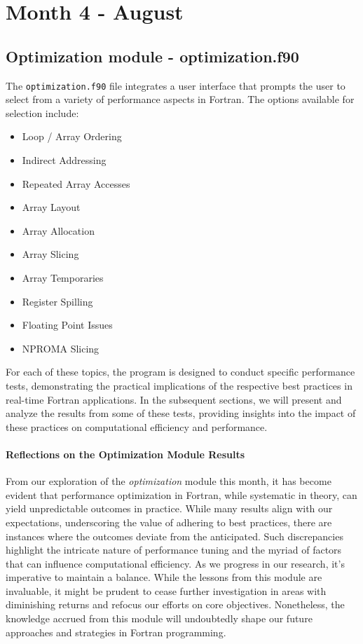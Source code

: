 \clearpage

\section{Month 4 - August}

\subsection{Optimization module - optimization.f90}
The \texttt{optimization.f90} file integrates a user interface that prompts the user to select from a variety of performance aspects in Fortran. The options available for selection include:

\begin{itemize}[itemsep=0.3ex]
    \item Loop / Array Ordering
    \item Indirect Addressing
    \item Repeated Array Accesses
    \item Array Layout
    \item Array Allocation
    \item Array Slicing
    \item Array Temporaries
    \item Register Spilling
    \item Floating Point Issues
    \item NPROMA Slicing
\end{itemize}

For each of these topics, the program is designed to conduct specific performance tests, demonstrating the practical implications of the respective best practices in real-time Fortran applications. In the subsequent sections, we will present and analyze the results from some of these tests, providing insights into the impact of these practices on computational efficiency and performance.

\paragraph{Reflections on the Optimization Module Results}
From our exploration of the \textit{optimization} module this month, it has become evident that performance optimization in Fortran, while systematic in theory, can yield unpredictable outcomes in practice. While many results align with our expectations, underscoring the value of adhering to best practices, there are instances where the outcomes deviate from the anticipated. Such discrepancies highlight the intricate nature of performance tuning and the myriad of factors that can influence computational efficiency. As we progress in our research, it's imperative to maintain a balance. While the lessons from this module are invaluable, it might be prudent to cease further investigation in areas with diminishing returns and refocus our efforts on core objectives. Nonetheless, the knowledge accrued from this module will undoubtedly shape our future approaches and strategies in Fortran programming.


